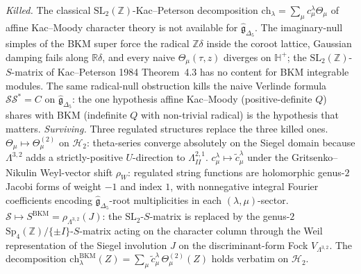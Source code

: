\begin{remark}
\label{rem:k3ca-string-functions-killed-surviving-hidden}
\emph{Killed.} The classical $\mathrm{SL}_2(\mathbb Z)$-Kac--Peterson decomposition $\mathrm{ch}_\lambda=\sum_\mu c^\lambda_\mu\Theta_\mu$ of affine Kac--Moody character theory is not available for $\hat{\mathfrak g}_{\Delta_5}$. The imaginary-null simples of the BKM super force the radical $\mathbb Z\delta$ inside the coroot lattice, Gaussian damping fails along $\mathbb R\delta$, and every naive $\Theta_\mu(\tau,z)$ diverges on $\mathbb H^+$; the $\mathrm{SL}_2(\mathbb Z)$-$S$-matrix of Kac--Peterson 1984 Theorem~4.3 has no content for BKM integrable modules. The same radical-null obstruction kills the naive Verlinde formula $\mathcal S\mathcal S^*=C$ on $\hat{\mathfrak g}_{\Delta_5}$: the one hypothesis affine Kac--Moody (positive-definite $Q$) shares with BKM (indefinite $Q$ with non-trivial radical) is the hypothesis that matters.
\emph{Surviving.} Three regulated structures replace the three killed ones. $\Theta_\mu\mapsto\Theta^{(2)}_\mu$ on $\mathcal H_2$: theta-series converge absolutely on the Siegel domain because $\Lambda^{3,2}$ adds a strictly-positive $U$-direction to $\Lambda^{2,1}_{II}$. $c^\lambda_\mu\mapsto\tilde c^\lambda_\mu$ under the Gritsenko--Nikulin Weyl-vector shift $\rho_W$: regulated string functions are holomorphic genus-$2$ Jacobi forms of weight $-1$ and index $1$, with nonnegative integral Fourier coefficients encoding $\hat{\mathfrak g}_{\Delta_5}$-root multiplicities in each $(\lambda,\mu)$-sector. $\mathcal S\mapsto S^{\mathrm{BKM}}=\rho_{\Lambda^{3,2}}(J)$: the $\mathrm{SL}_2$-$S$-matrix is replaced by the genus-$2$ $\mathrm{Sp}_4(\mathbb Z)/\{\pm I\}$-$S$-matrix acting on the character column through the Weil representation of the Siegel involution $J$ on the discriminant-form Fock $V_{\Lambda^{3,2}}$. The decomposition $\mathrm{ch}_\lambda^{\mathrm{BKM}}(Z)=\sum_\mu\tilde c^\lambda_\mu\,\Theta^{(2)}_\mu(Z)$ holds verbatim on $\mathcal H_2$.

\end{remark}
